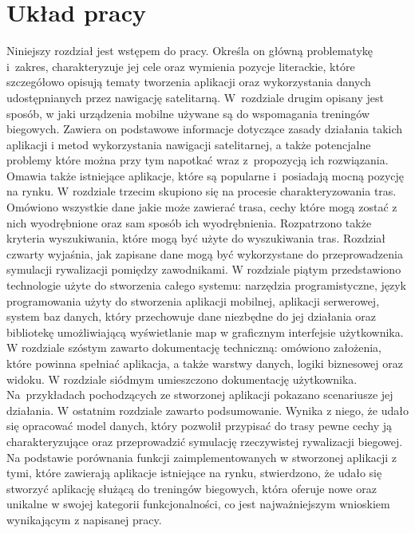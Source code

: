 \section{Układ pracy}
Niniejszy rozdział jest wstępem do pracy. Określa on główną problematykę i~zakres, charakteryzuje jej cele oraz wymienia pozycje literackie, które szczegółowo opisują tematy tworzenia aplikacji oraz wykorzystania danych udostępnianych przez nawigację satelitarną. W~rozdziale drugim opisany jest sposób, w jaki urządzenia mobilne używane są do wspomagania treningów biegowych. Zawiera on podstawowe informacje dotyczące zasady działania takich aplikacji i metod wykorzystania nawigacji satelitarnej, a także potencjalne problemy które można przy tym napotkać wraz z~propozycją ich rozwiązania. Omawia także istniejące aplikacje, które są popularne i~posiadają mocną pozycję na rynku. W rozdziale trzecim skupiono się na procesie charakteryzowania tras. Omówiono wszystkie dane jakie może zawierać trasa, cechy które mogą zostać z nich wyodrębnione oraz sam sposób ich wyodrębnienia. Rozpatrzono także kryteria wyszukiwania, które mogą być użyte do wyszukiwania tras. Rozdział czwarty wyjaśnia, jak zapisane dane mogą być wykorzystane do przeprowadzenia symulacji rywalizacji pomiędzy zawodnikami. W rozdziale piątym przedstawiono technologie użyte do stworzenia całego systemu: narzędzia programistyczne, język programowania użyty do stworzenia aplikacji mobilnej, aplikacji serwerowej, system baz danych, który przechowuje dane niezbędne do jej działania oraz bibliotekę umożliwiającą wyświetlanie map w graficznym interfejsie użytkownika. W rozdziale szóstym zawarto dokumentację techniczną: omówiono założenia, które powinna spełniać aplikacja, a także warstwy danych, logiki biznesowej oraz widoku. W rozdziale siódmym umieszczono dokumentację użytkownika. Na~przykładach pochodzących ze stworzonej aplikacji pokazano scenariusze jej działania. W ostatnim rozdziale zawarto podsumowanie. Wynika z niego, że udało się opracować model danych, który pozwolił przypisać do trasy pewne cechy ją charakteryzujące oraz przeprowadzić symulację rzeczywistej rywalizacji biegowej. Na podstawie porównania funkcji zaimplementowanych w stworzonej aplikacji z tymi, które zawierają aplikacje istniejące na rynku, stwierdzono, że udało się stworzyć aplikację służącą do treningów biegowych, która oferuje nowe oraz unikalne w swojej kategorii funkcjonalności, co jest najważniejszym wnioskiem wynikającym z napisanej pracy.